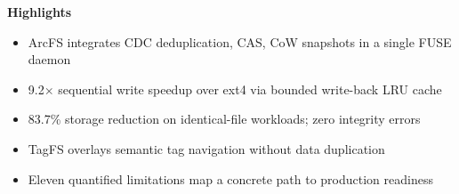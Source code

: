 \documentclass{article}
\begin{document}
\noindent\textbf{Highlights}

\begin{itemize}
  \item ArcFS integrates CDC deduplication, CAS, CoW snapshots in a single FUSE daemon
  \item 9.2$\times$ sequential write speedup over ext4 via bounded write-back LRU cache
  \item 83.7\% storage reduction on identical-file workloads; zero integrity errors
  \item TagFS overlays semantic tag navigation without data duplication
  \item Eleven quantified limitations map a concrete path to production readiness
\end{itemize}
\end{document}
